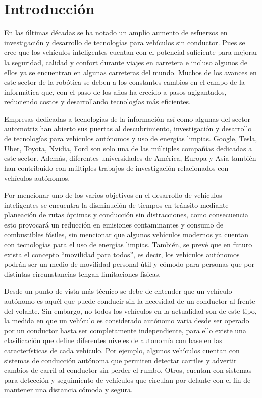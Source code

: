 \chapter{Introducción}
En las últimas décadas se ha notado un amplío aumento de esfuerzos en investigación y desarrollo de tecnologías para vehículos sin conductor. Pues se cree que los vehículos inteligentes cuentan con el potencial suficiente para mejorar la seguridad, calidad y confort durante viajes en carretera e incluso algunos de ellos ya se encuentran en algunas carreteras del mundo. Muchos de los avances en este sector de la robótica se deben a los constantes cambios en el campo de la informática que, con el paso de los años ha crecido a pasos agigantados, reduciendo costos y desarrollando tecnologías más eficientes. 

Empresas dedicadas a tecnologías de la información así como algunas del sector automotriz han abierto sus puertas al descubrimiento, investigación y desarrollo de tecnologías para vehículos autónomos y uso de energías limpias. Google, Tesla, Uber, Toyota, Nvidia, Ford son solo una de las múltiples compañías dedicadas a este sector. Además, diferentes universidades de América, Europa y Asia también han contribuido con múltiples trabajos de investigación relacionados con vehículos autónomos.

Por mencionar uno de los varios objetivos en el desarrollo de vehículos inteligentes se encuentra la disminución de tiempos en tránsito mediante planeación de rutas óptimas y conducción sin distracciones, como consecuencia esto provocará un reducción en emisiones contaminantes y consumo de combustibles fósiles, sin mencionar que algunos vehículos modernos ya cuentan con tecnologías para el uso de energías limpias. También, se prevé que en futuro exista el concepto ``movilidad para todos'', es decir, los vehículos autónomos podrán ser un medio de movilidad personal útil y cómodo para personas que por distintas circunstancias tengan limitaciones físicas.

Desde un punto de vista más técnico se debe de entender que un vehículo autónomo es aquél que puede conducir sin la necesidad de un conductor al frente del volante. Sin embargo, no todos los vehículos en la actualidad son de este tipo, la medida en que un vehículo es considerado autónomo varia desde ser operado por un conductor hasta ser completamente independiente, para ello existe una clasificación que define diferentes niveles de autonomía con base en las características de cada vehículo. Por ejemplo, algunos vehículos cuentan con sistemas de conducción autónoma que permiten detectar carriles y advertir cambios de carril al conductor sin perder el rumbo. Otros, cuentan con sistemas para detección y seguimiento de vehículos que circulan por delante con el fin de mantener una distancia cómoda y segura.

